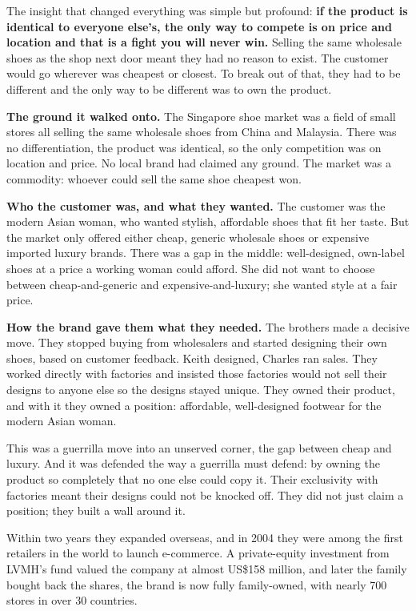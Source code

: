 \documentclass[10pt,twoside,openany]{memoir}
\begin{document}
The insight that changed everything was simple but profound: \textbf{if
the product is identical to everyone else's, the only way to compete is
on price and location and that is a fight you will never win.} Selling
the same wholesale shoes as the shop next door meant they had no reason
to exist. The customer would go wherever was cheapest or closest. To
break out of that, they had to be different and the only way to be
different was to own the product.

\textbf{The ground it walked onto.} The Singapore shoe market was a
field of small stores all selling the same wholesale shoes from China
and Malaysia. There was no differentiation, the product was identical,
so the only competition was on location and price. No local brand had
claimed any ground. The market was a commodity: whoever could sell the
same shoe cheapest won.

\textbf{Who the customer was, and what they wanted.} The customer was
the modern Asian woman, who wanted stylish, affordable shoes that fit
her taste. But the market only offered either cheap, generic wholesale
shoes or expensive imported luxury brands. There was a gap in the
middle: well-designed, own-label shoes at a price a working woman could
afford. She did not want to choose between cheap-and-generic and
expensive-and-luxury; she wanted style at a fair price.

\textbf{How the brand gave them what they needed.} The brothers made a
decisive move. They stopped buying from wholesalers and started
designing their own shoes, based on customer feedback. Keith designed,
Charles ran sales. They worked directly with factories and insisted
those factories would not sell their designs to anyone else so the
designs stayed unique. They owned their product, and with it they owned
a position: affordable, well-designed footwear for the modern Asian
woman.

This was a guerrilla move into an unserved corner, the gap between cheap
and luxury. And it was defended the way a guerrilla must defend: by
owning the product so completely that no one else could copy it. Their
exclusivity with factories meant their designs could not be knocked off.
They did not just claim a position; they built a wall around it.

Within two years they expanded overseas, and in 2004 they were among the
first retailers in the world to launch e-commerce. A private-equity
investment from LVMH's fund valued the company at almost US\$158
million, and later the family bought back the shares, the brand is now
fully family-owned, with nearly 700 stores in over 30 countries.
\end{document}
